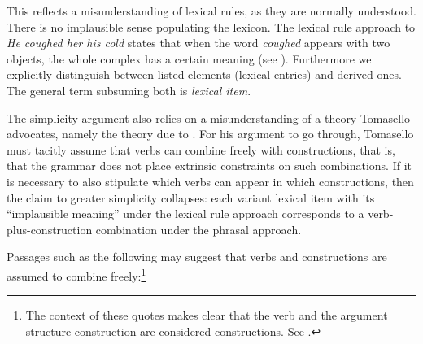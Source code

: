 \noindent
This reflects a misunderstanding of lexical rules, as they are normally understood.  There is no implausible sense populating the lexicon.
The lexical rule approach to \emph{He coughed her his cold} states that when the word \emph{coughed} appears with
two objects, the whole complex has a certain meaning (see \citealp[]{Mueller2006d}). Furthermore we explicitly distinguish between listed elements
(lexical entries) and derived ones. The general term subsuming both is \emph{lexical item}.


The simplicity argument also relies on a misunderstanding of a theory Tomasello advocates, namely the
theory due to \citet{Goldberg95a, Goldberg2006a}.  For his argument to go through, Tomasello must tacitly assume
that verbs can combine freely with constructions, that is, that the grammar does not place extrinsic
constraints on such combinations.  If it is necessary to also stipulate which verbs can appear in
which constructions, then the claim to greater simplicity collapses: each variant lexical item with
its ``implausible meaning'' under the lexical rule approach corresponds to a verb-plus-construction
combination under the phrasal approach. 

Passages such as the following may suggest that verbs and constructions are assumed to combine
freely:\footnote{%
  The context of these quotes makes clear that the verb and the argument structure construction are
  considered constructions.  See \citet[, ex.~(2)]{Goldberg2006a}.} 


